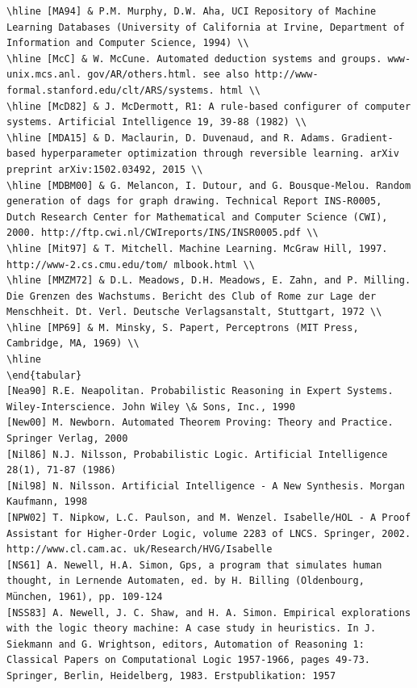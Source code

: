 \documentclass[10pt]{article}
\begin{document}
\begin{verbatim}
\hline [MA94] & P.M. Murphy, D.W. Aha, UCI Repository of Machine Learning Databases (University of California at Irvine, Department of Information and Computer Science, 1994) \\
\hline [McC] & W. McCune. Automated deduction systems and groups. www-unix.mcs.anl. gov/AR/others.html. see also http://www-formal.stanford.edu/clt/ARS/systems. html \\
\hline [McD82] & J. McDermott, R1: A rule-based configurer of computer systems. Artificial Intelligence 19, 39-88 (1982) \\
\hline [MDA15] & D. Maclaurin, D. Duvenaud, and R. Adams. Gradient-based hyperparameter optimization through reversible learning. arXiv preprint arXiv:1502.03492, 2015 \\
\hline [MDBM00] & G. Melancon, I. Dutour, and G. Bousque-Melou. Random generation of dags for graph drawing. Technical Report INS-R0005, Dutch Research Center for Mathematical and Computer Science (CWI), 2000. http://ftp.cwi.nl/CWIreports/INS/INSR0005.pdf \\
\hline [Mit97] & T. Mitchell. Machine Learning. McGraw Hill, 1997. http://www-2.cs.cmu.edu/tom/ mlbook.html \\
\hline [MMZM72] & D.L. Meadows, D.H. Meadows, E. Zahn, and P. Milling. Die Grenzen des Wachstums. Bericht des Club of Rome zur Lage der Menschheit. Dt. Verl. Deutsche Verlagsanstalt, Stuttgart, 1972 \\
\hline [MP69] & M. Minsky, S. Papert, Perceptrons (MIT Press, Cambridge, MA, 1969) \\
\hline
\end{tabular}
[Nea90] R.E. Neapolitan. Probabilistic Reasoning in Expert Systems. Wiley-Interscience. John Wiley \& Sons, Inc., 1990
[New00] M. Newborn. Automated Theorem Proving: Theory and Practice. Springer Verlag, 2000
[Nil86] N.J. Nilsson, Probabilistic Logic. Artificial Intelligence 28(1), 71-87 (1986)
[Nil98] N. Nilsson. Artificial Intelligence - A New Synthesis. Morgan Kaufmann, 1998
[NPW02] T. Nipkow, L.C. Paulson, and M. Wenzel. Isabelle/HOL - A Proof Assistant for Higher-Order Logic, volume 2283 of LNCS. Springer, 2002. http://www.cl.cam.ac. uk/Research/HVG/Isabelle
[NS61] A. Newell, H.A. Simon, Gps, a program that simulates human thought, in Lernende Automaten, ed. by H. Billing (Oldenbourg, München, 1961), pp. 109-124
[NSS83] A. Newell, J. C. Shaw, and H. A. Simon. Empirical explorations with the logic theory machine: A case study in heuristics. In J. Siekmann and G. Wrightson, editors, Automation of Reasoning 1: Classical Papers on Computational Logic 1957-1966, pages 49-73. Springer, Berlin, Heidelberg, 1983. Erstpublikation: 1957

\end{verbatim}
\end{document}

